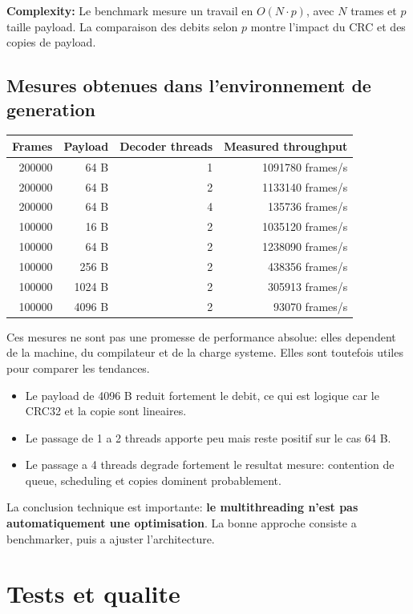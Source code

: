 \documentclass[10pt,a4paper]{article}
\newcommand{\complexity}[1]{\textbf{Complexity:} #1}
\begin{document}
\complexity{Le benchmark mesure un travail en $O(N \cdot p)$, avec $N$ trames et $p$ taille payload. La comparaison des debits selon $p$ montre l'impact du CRC et des copies de payload.}

\subsection{Mesures obtenues dans l'environnement de generation}

\begin{longtable}{@{}rrrr@{}}
\toprule
Frames & Payload & Decoder threads & Measured throughput \\
\midrule
200000 & 64 B & 1 & 1091780 frames/s \\
200000 & 64 B & 2 & 1133140 frames/s \\
200000 & 64 B & 4 & 135736 frames/s \\
100000 & 16 B & 2 & 1035120 frames/s \\
100000 & 64 B & 2 & 1238090 frames/s \\
100000 & 256 B & 2 & 438356 frames/s \\
100000 & 1024 B & 2 & 305913 frames/s \\
100000 & 4096 B & 2 & 93070 frames/s \\
\bottomrule
\end{longtable}


Ces mesures ne sont pas une promesse de performance absolue: elles dependent de la machine, du compilateur et de la charge systeme. Elles sont toutefois utiles pour comparer les tendances.

\begin{itemize}
  \item Le payload de 4096 B reduit fortement le debit, ce qui est logique car le CRC32 et la copie sont lineaires.
  \item Le passage de 1 a 2 threads apporte peu mais reste positif sur le cas 64 B.
  \item Le passage a 4 threads degrade fortement le resultat mesure: contention de queue, scheduling et copies dominent probablement.
\end{itemize}

La conclusion technique est importante: \textbf{le multithreading n'est pas automatiquement une optimisation}. La bonne approche consiste a benchmarker, puis a ajuster l'architecture.

\section{Tests et qualite}
\end{document}
